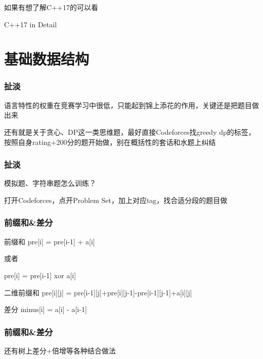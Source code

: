 \documentclass{beamer}
\begin{document}
  \begin{frame}
    如果有想了解C++17的可以看

    C++17 in Detail
  \end{frame}

  \section{基础数据结构}

  \begin{frame}
    \frametitle{扯淡}

    语言特性的权重在竞赛学习中很低，只能起到锦上添花的作用，关键还是把题目做出来

    \vspace*{1\baselineskip}

    还有就是关于贪心、DP这一类思维题，最好直接Codeforces找greedy dp的标签，按照自身rating+200分的题开始做，别在概括性的套话和水题上纠结

  \end{frame}

  \begin{frame}
    \frametitle{扯淡}

    模拟题、字符串题怎么训练？

    \vspace*{1\baselineskip}

    打开Codeforces，点开Problem Set，加上对应tag，找合适分段的题目做
  \end{frame}

  \begin{frame}[fragile]
    \frametitle{前缀和\&差分}

    \begin{block}{前缀和}
      pre[i] = pre[i-1] + a[i]
      
      或者

      pre[i] = pre[i-1] xor a[i]
    \end{block}

    \begin{block}{二维前缀和}
      pre[i][j] = pre[i-1][j]+pre[i][j-1]-pre[i-1][j-1]+a[i][j]
    \end{block}

    \begin{block}{差分}
      minus[i] = a[i] - a[i-1]
    \end{block}
  \end{frame}

  \begin{frame}
    \frametitle{前缀和\&差分}
    还有树上差分+倍增等各种结合做法

    \vspace*{1\baselineskip}
  \end{frame}
\end{document}
